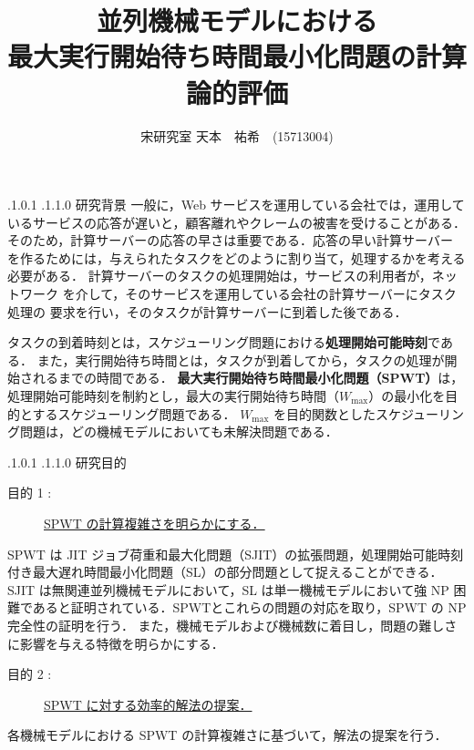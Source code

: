 \documentclass[oneside, 10pt, twocolumn]{jarticle}
\title{\bf{\rm
並列機械モデルにおける\\最大実行開始待ち時間最小化問題の計算論的評価}}
\author{宋研究室
\hspace{15pt}
天本　祐希　(15713004)}
\date{}
\makeatletter
\def\section{\@startsection {section}{1}{\z@}{-3.5ex plus -1ex minus
-.2ex}{2.3 ex plus .2ex}{\large\bf}}
\renewcommand{\section}{
\@startsection{section}{1}{\z@}
{.1\Cvs \@plus.0\Cdp \@minus.1\Cdp}%
{.1\Cvs \@plus.1\Cdp \@minus.0\Cdp}%
{\reset@font\large\bfseries}}      %
\makeatother
\begin{document}
\maketitle
\thispagestyle{empty}
\section{研究背景}
一般に，Web サービスを運用している会社では，運用しているサービスの応答が遅いと，顧客離れやクレームの被害を受けることがある．
そのため，計算サーバーの応答の早さは重要である．応答の早い計算サーバー
を作るためには，与えられたタスクをどのように割り当て，処理するかを考える必要がある．
計算サーバーのタスクの処理開始は，サービスの利用者が，ネットワーク
を介して，そのサービスを運用している会社の計算サーバーにタスク処理の
要求を行い，そのタスクが計算サーバーに到着した後である．

タスクの到着時刻とは，スケジューリング問題における{\bf 処理開始可能時刻}である．
また，実行開始待ち時間とは，タスクが到着してから，タスクの処理が開始されるまでの時間である．
{\bf 最大実行開始待ち時間最小化問題（SPWT）}は，処理開始可能時刻を制約とし，最大の実行開始待ち時間（\mbox{\boldmath $W_{\max}$}）の最小化を目的とするスケジューリング問題である．
$W_{\max}$ を目的関数としたスケジューリング問題は，どの機械モデルにおいても未解決問題である．

\section{研究目的}

\begin{description}
  \item[目的 1 :]
  \underline{SPWT の計算複雑さを明らかにする．}
\end{description}
SPWT は JIT ジョブ荷重和最大化問題（SJIT）の拡張問題，処理開始可能時刻付き最大遅れ時間最小化問題（SL）の部分問題として捉えることができる．SJIT は無関連並列機械モデルにおいて，SL は単一機械モデルにおいて強 NP 困難であると証明されている．SPWTとこれらの問題の対応を取り，SPWT の NP 完全性の証明を行う．
また，機械モデルおよび機械数に着目し，問題の難しさに影響を与える特徴を明らかにする．

\begin{description}
  \item[目的 2 :]
  \underline{SPWT に対する効率的解法の提案．}
\end{description}
各機械モデルにおける SPWT の計算複雑さに基づいて，解法の提案を行う．
\end{document}
